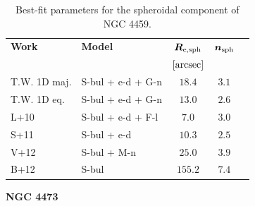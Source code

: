 \documentclass[preprint2]{emulateapj}
\begin{document}
  \begin{table}[h]
  \small
  \caption{Best-fit parameters for the spheroidal component of NGC 4459.}
  \begin{center}
  \begin{tabular}{llccc}
  \hline
  {\bf Work} & {\bf Model}   & $\bm R_{\rm e,sph}$    & $\bm n_{\rm sph}$ \\
    &  &  $[\rm arcsec]$ & \\
  \hline
  T.W. 1D maj. & S-bul + e-d + G-n & $18.4$  &  $3.1$ \\
  T.W. 1D eq.  & S-bul + e-d + G-n & $13.0$  &  $2.6$ \\
  \hline
  L+10      & S-bul + e-d + F-l & $7.0$   &  $3.0$ \\
  S+11      & S-bul + e-d	& $10.3$  &  $2.5$ \\
  V+12      & S-bul + M-n	& $25.0$  &  $3.9$ \\
  B+12      & S-bul		& $155.2$ &  $7.4$ \\
  \hline
  \end{tabular}
  \end{center}
  \label{tab:n4459}
  \end{table}




  \clearpage\newpage\noindent
  {\bf NGC 4473 \\}
\end{document}
